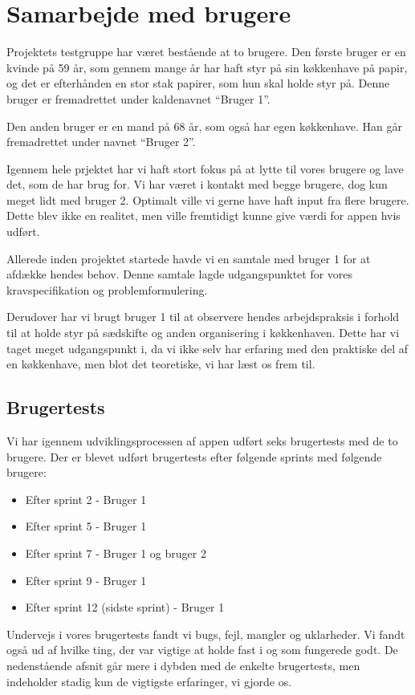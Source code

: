\section{Samarbejde med brugere}
Projektets testgruppe har været bestående at to brugere. Den første bruger er en kvinde på 59 år, som gennem mange år har haft styr på sin køkkenhave på papir, og det er efterhånden en stor stak papirer, som hun skal holde styr på. Denne bruger er fremadrettet under kaldenavnet ``Bruger 1''.

Den anden bruger er en mand på 68 år, som også har egen køkkenhave. Han går fremadrettet under navnet ``Bruger 2''.

Igennem hele prjektet har vi haft stort fokus på at lytte til vores brugere og lave det, som de har brug for. Vi har været i kontakt med begge brugere, dog kun meget lidt med bruger 2. Optimalt ville vi gerne have haft input fra flere brugere. Dette blev ikke en realitet, men ville fremtidigt kunne give værdi for appen hvis udført.

Allerede inden projektet startede havde vi en samtale med bruger 1 for at afdække hendes behov. Denne samtale lagde udgangspunktet for vores kravspecifikation og problemformulering.

Derudover har vi brugt bruger 1 til at observere hendes arbejdspraksis i forhold til at holde styr på sædskifte og anden organisering i køkkenhaven. Dette har vi taget meget udgangspunkt i, da vi ikke selv har erfaring med den praktiske del af en køkkenhave, men blot det teoretiske, vi har læst os frem til.

\subsection{Brugertests}
Vi har igennem udviklingsprocessen af appen udført seks brugertests med de to brugere. Der er blevet udført brugertests efter følgende sprints med følgende brugere:
\begin{itemize}
    \item Efter sprint 2 - Bruger 1
    \item Efter sprint 5 - Bruger 1
    \item Efter sprint 7 - Bruger 1 og bruger 2
    \item Efter sprint 9 - Bruger 1
    \item Efter sprint 12 (sidste sprint) - Bruger 1
\end{itemize}

Undervejs i vores brugertests fandt vi bugs, fejl, mangler og uklarheder. Vi fandt også ud af hvilke ting, der var vigtige at holde fast i og som fungerede godt. De nedenstående afsnit går mere i dybden med de enkelte brugertests, men indeholder stadig kun de vigtigste erfaringer, vi gjorde os.

